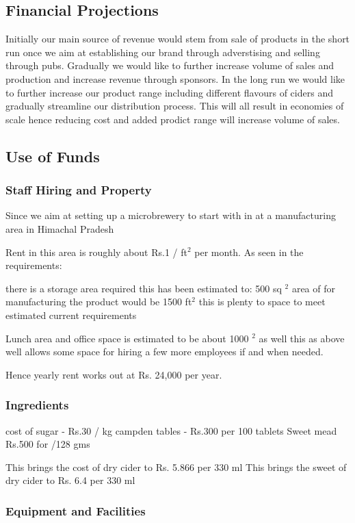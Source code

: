 \documentclass[11pt]{article}
\begin{document}
  \subsection{Financial Projections}
Initially our main source of revenue would stem from sale of products in the short run once we aim at establishing our brand through adverstising and selling through pubs. Gradually we would like to further increase volume of sales and production and increase revenue through sponsors. In the long run we would like to further increase our product range including different flavours of ciders and gradually streamline our distribution process. This will all result in economies of scale hence reducing cost and added prodict range will increase volume of sales.

  \subsection{Use of Funds}
      \subsubsection{Staff Hiring and Property}
Since we aim at setting up a microbrewery to start with in at a manufacturing area in Himachal Pradesh

Rent in this area is roughly about Rs.1 / ft$^2$ per month.
As seen in the requirements:

there is a storage area required this has been estimated to: 500 sq $^2$ area of for manufacturing the product would be 1500 ft$^2$ this is plenty to space to meet estimated current requirements

Lunch area and office space is estimated to be about 1000 $^2$ as well this as above well allows some space for hiring a few more employees if and when needed.

Hence yearly rent works out at Rs. 24,000 per year.
   \subsubsection{Ingredients}
cost of sugar -  Rs.30 / kg
campden tables  - Rs.300 per 100 tablets
Sweet mead Rs.500 for /128 gms 


This brings the cost of dry cider to Rs. 5.866 per 330 ml
This brings the sweet of dry cider to Rs. 6.4 per 330 ml

\subsubsection{Equipment and Facilities}
\newpage
\end{document}
